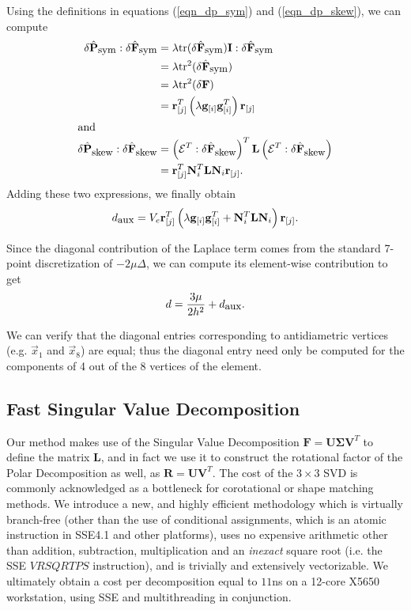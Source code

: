 Using the definitions in equations (\ref{eqn_dp_sym}) and
(\ref{eqn_dp_skew}), we can compute
\begin{align*}
\delta\hat{\mathbf{P}}_{\mbox{\small sym}}:\delta\hat{\mathbf{F}}_{\mbox{\small sym}} &=
\lambda\mbox{tr}(\delta\hat{\mathbf{F}}_{\mbox{\small sym}})\mathbf{I}:\delta\hat{\mathbf{F}}_{\mbox{\small sym}}\\
&=\lambda\mbox{tr}^2(\delta\hat{\mathbf{F}}_{\mbox{\small sym}})\\
&=\lambda\mbox{tr}^2(\delta\mathbf{F})\\
&=\mathbf{r}^T_{[j]}\left(\lambda\mathbf{g}_{[i]}\mathbf{g}_{[i]}^T\right)\mathbf{r}_{[j]}\\
\intertext{and}
\delta\hat{\mathbf{P}}_{\mbox{\small skew}}:\delta\hat{\mathbf{F}}_{\mbox{\small skew}}&=\left(\mathcal{E}^T:\delta\hat{\mathbf{F}}_{\mbox{\small skew}}\right)^T\mathbf{L}\left(\mathcal{E}^T:\delta\hat{\mathbf{F}}_{\mbox{\small skew}}\right)\\
&=\mathbf{r}^T_{[j]}\mathbf{N}_i^T\mathbf{L}\mathbf{N}_i\mathbf{r}_{[j]}.
\end{align*}
Adding these two expressions, we finally obtain
\begin{equation}\label{eqn:diagonal_aux}
d_{\mbox{\small aux}}=V_e\mathbf{r}^T_{[j]}\left(\lambda
\mathbf{g}_{[i]}\mathbf{g}_{[i]}^T +
\mathbf{N}_i^T\mathbf{L}\mathbf{N}_i\right)\mathbf{r}_{[j]}.
\end{equation}

Since the diagonal contribution of the Laplace term comes from the
standard 7-point discretization of $-2\mu\Delta$, we can compute its
element-wise contribution to get
\begin{equation}\label{eqn:diagonal_total}
d=\frac{3\mu}{2 h^2} + d_{\mbox{\small aux}}.
\end{equation}


We can verify that the diagonal entries corresponding to antidiametric vertices (e.g. $\vec{x}_1$ and $\vec{x}_8$) are equal; thus the diagonal entry need only be computed for the
components of 4 out of the 8 vertices of the element. 

\subsection{Fast Singular Value Decomposition}

Our method makes use of the Singular Value Decomposition $\mathbf{F}=\mathbf{U\Sigma V}^T$ to define the matrix $\mathbf{L}$, and in fact we use it to construct the rotational factor of
the Polar Decomposition as well, as $\mathbf{R}=\mathbf{UV}^T$. The cost of the $3\times 3$ SVD is commonly acknowledged as a bottleneck for corotational or shape matching methods. We
introduce a new, and highly efficient methodology which is virtually branch-free (other than the use of conditional assignments, which is an atomic instruction in SSE4.1 and other
platforms), uses no expensive arithmetic other than addition, subtraction, multiplication and an \emph{inexact} square root (i.e. the SSE $VRSQRTPS$ instruction), and is trivially
and extensively vectorizable. We ultimately obtain a cost per decomposition equal to $11$ns on a 12-core X5650 workstation, using SSE and multithreading in conjunction. 

